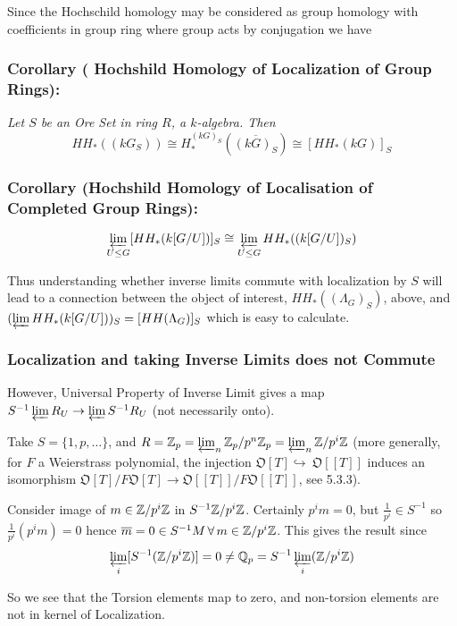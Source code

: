Since the Hochschild homology may be considered as group homology with coefficients in group ring where group acts by conjugation we have

\subsubsection{Corollary ( Hochshild Homology of Localization of Group Rings):\label{homiscool}}
\emph{Let $S$ be an Ore Set in ring $R$, a $k$-algebra. Then
$$HH_*((kG_S))\cong H_*^{(kG)_S}(\overline{(kG)_S}) \cong [HH_*(kG)]_S$$ }

\subsubsection*{Corollary (Hochshild Homology of Localisation of Completed Group Rings):}

$$\varprojlim_{U\leq G} [HH_*(k[G/U])]_S \cong \varprojlim_{U\leq G}HH_*((k[G/U])_S)$$

Thus understanding whether inverse limits commute with localization by $S$ will lead to a connection between the object of interest, $HH_*((\Lambda_G)_S)$, above, and $(\varprojlim HH_* (k[G/U]))_S = [HH(\Lambda_G)]_S$ which is easy to calculate.

\subsubsection*{Localization and taking Inverse Limits does not Commute}
 However, Universal Property of Inverse Limit gives a map $ S^{-1}\varprojlim R_U \rightarrow \varprojlim S^{-1} R_U$ (not necessarily onto).

Take $S=\{1,p, \dots\}$, and $R= \mathbb Z_p = \varprojlim_n \mathbb Z_p / p^n\mathbb Z_p = \varprojlim_n \mathbb Z / p^i\mathbb Z$ (more generally, for $F$ a Weierstrass polynomial, the injection $\mathfrak O [T]\hookrightarrow \ \mathfrak O [[T]]$ induces an isomorphism $\mathfrak O [T] / F \mathfrak O [T]  \rightarrow \mathfrak O [[T]] / F \mathfrak O [[T]]$, see \cite{N} 5.3.3). 


Consider image of $m\in  \mathbb Z / p^i\mathbb Z$ in  $S^{-1}  \mathbb Z / p^i\mathbb Z$. Certainly $p^i m = 0$, but $\frac{1}{p^i}\in S^{-1}$ so $\frac{1}{p^i} (p^i m) =0$ hence $\overline m = 0 \in S^{-1} M \,\forall \,m \in  \mathbb Z / p^i\mathbb Z$. This gives the result since
$$\varprojlim_i [ S^{-1} (\mathbb Z / p^i\mathbb Z)] = 0 \neq \mathbb Q_p = S^{-1} \varprojlim_i  (\mathbb Z / p^i\mathbb Z)$$

So we see that the Torsion elements map to zero, and non-torsion elements are not in kernel of Localization.

